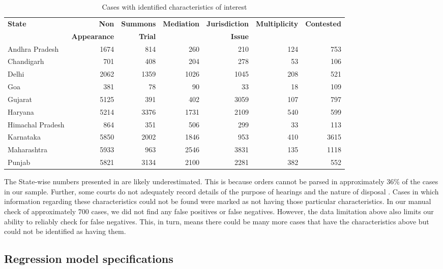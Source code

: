 {\footnotesize
 \begin{longtable}{@{}lrrrrrr@{}}
 \caption{Cases with identified characteristics of interest}
 \label{tab:case_chars}\\
 \toprule
 \textbf{State} & \textbf{Non} & \textbf{Summons} & \textbf{Mediation} & \textbf{Jurisdiction} & \textbf{Multiplicity} & \textbf{Contested} \\
 & \textbf{Appearance} & \textbf{Trial} & & \textbf{Issue} & &\\
 \midrule
 \endhead
 Andhra Pradesh & 1674 & 814 & 260 & 210 & 124 & 753 \\
 Chandigarh & 701 & 408 & 204 & 278 & 53 & 106 \\
 Delhi & 2062 & 1359 & 1026 & 1045 & 208 & 521 \\
 Goa & 381 & 78 & 90 & 33 & 18 & 109 \\
 Gujarat & 5125 & 391 & 402 & 3059 & 107 & 797 \\
 Haryana & 5214 & 3376 & 1731 & 2109 & 540 & 599 \\
 Himachal Pradesh & 864 & 351 & 506 & 299 & 33 & 113 \\
 Karnataka & 5850 & 2002 & 1846 & 953 & 410 & 3615 \\
 Maharashtra & 5933 & 963 & 2546 & 3831 & 135 & 1118 \\
 Punjab & 5821 & 3134 & 2100 & 2281 & 382 & 552 \\
 \bottomrule
\end{longtable}
}

The State-wise numbers presented in  are likely underestimated. This is because orders cannot be parsed in approximately 36\% of the cases in our sample. Further, some courts do not adequately record details of the purpose of hearings and the nature of disposal \autocite{damle2020_ecourtsData}. Cases in which information regarding these characteristics could not be found were marked as not having those particular characteristics. In our manual check of approximately 700 cases, we did not find any false positives or false negatives. However, the data limitation above also limits our ability to reliably check for false negatives. This, in turn, means there could be many more cases that have the characteristics above but could not be identified as having them.

\subsection{Regression model specifications} \label{sec:model-selection}


